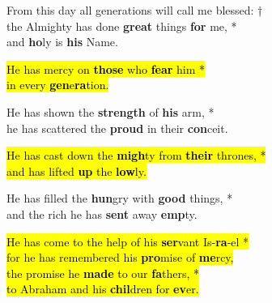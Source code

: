 

From this day all generations will call me blessed: †\\
the Almighty has done \textbf{great} things \textbf{for} me, *\\
and \textbf{ho}ly is \textbf{his} Name.

\hl{He has mercy on \textbf{those} who \textbf{fear} him *\\
in every \textbf{gen}e\textbf{ra}tion.}

He has shown the \textbf{strength} of \textbf{his} arm, *\\
he has scattered the \textbf{proud} in their \textbf{con}ceit.

\hl{He has cast down the \textbf{migh}ty from \textbf{their} thrones, *\\
and has lifted \textbf{up} the \textbf{low}ly.}

He has filled the \textbf{hun}gry with \textbf{good} things, *\\
and the rich he has \textbf{sent} away \textbf{emp}ty.

\hl{He has come to the help of his \textbf{ser}vant Is-\textbf{ra}-el *\\
for he has remembered his \textbf{pro}mise of \textbf{me}rcy,\\
the promise he \textbf{made} to our \textbf{fa}thers, *\\
to Abraham and his \textbf{chil}dren for \textbf{ev}er.}